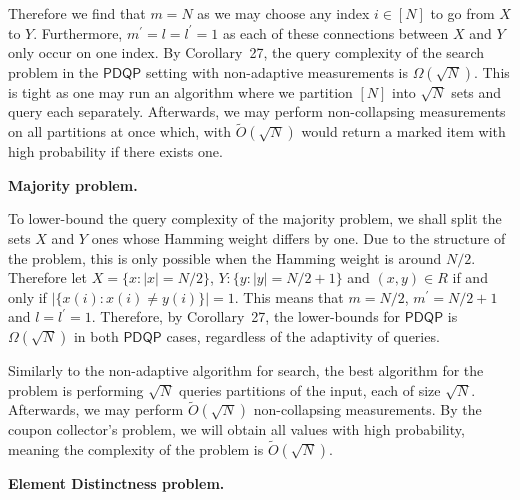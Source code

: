 Therefore we find that $m=N$ as we may choose any index $i\in[N]$ to go from $X$ to $Y$. Furthermore, $m^{\prime}=l=l^{\prime}=1$ as each of these connections between $X$ and $Y$ only occur on one index. By Corollary 27, the query complexity of the search problem in the $\mathsf{PDQP}$ setting with non-adaptive measurements is $\Omega(\sqrt{N})$. This is tight as one may run an algorithm where we partition $[N]$ into $\sqrt{N}$ sets and query each separately. Afterwards, we may perform non-collapsing measurements on all partitions at once which, with $\tilde{O}(\sqrt{N})$ would return a marked item with high probability if there exists one.\par





\par\medskip\noindent\textbf{Majority problem.}\par




To lower-bound the query complexity of the majority problem, we shall split the sets $X$ and $Y$ ones whose Hamming weight differs by one. Due to the structure of the problem, this is only possible when the Hamming weight is around $N/2$. Therefore let $X=\{x:|x|=N/2\}$, $Y:\{y:|y|=N/2+1\}$ and $(x,y)\in R$ if and only if $|\{x(i):x(i)\neq y(i)\}|=1$. This means that $m=N/2$, $m^{\prime}=N/2+1$ and $l=l^{\prime}=1$. Therefore, by Corollary 27, the lower-bounds for $\mathsf{PDQP}$ is $\Omega(\sqrt{N})$ in both $\mathsf{PDQP}$ cases, regardless of the adaptivity of queries.\par




Similarly to the non-adaptive algorithm for search, the best algorithm for the problem is performing $\sqrt{N}$ queries partitions of the input, each of size $\sqrt{N}$. Afterwards, we may perform $\tilde{O}(\sqrt{N})$ non-collapsing measurements. By the coupon collector’s problem, we will obtain all values with high probability, meaning the complexity of the problem is $\tilde{O}(\sqrt{N})$.\par





\par\medskip\noindent\textbf{Element Distinctness problem.}\par




